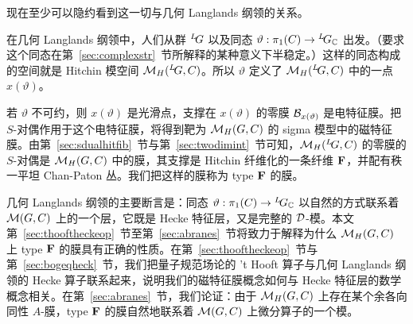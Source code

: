 现在至少可以隐约看到这一切与几何 Langlands 纲领的关系。

在几何 Langlands 纲领中，人们从群 $^L\negthinspace G$ 以及同态 $\vartheta:\pi_1(C)\to{}^L\negthinspace G_{\Bbb{C}}$ 出发。（要求这个同态在第~\ref{sec:complexstr}~节所解释的某种意义下半稳定。）这样的同态构成的空间就是 Hitchin 模空间 $\MH(^L\negthinspace G,C)$。所以 $\vartheta$ 定义了 $\MH(^L\negthinspace G,C)$ 中的一点 $x(\vartheta)$。

若 $\vartheta$ 不可约，则 $x(\vartheta)$ 是光滑点，支撑在 $x(\vartheta)$ 的零膜 ${\cal B}_{x(\vartheta)}$ 是电特征膜。把 $S$-对偶作用于这个电特征膜，将得到靶为 $\MH(G,C)$ 的 sigma 模型中的磁特征膜。由第~\ref{sec:sdualhitfib}~节与第~\ref{sec:twodimint}~节可知，$\MH(^L\negthinspace G,C)$ 的零膜的 $S$-对偶是 $\MH(G,C)$ 中的膜，其支撑是 Hitchin 纤维化的一条纤维 ${\CMF}$，并配有秩一平坦 Chan-Paton 丛。我们把这样的膜称为 type ${\CMF}$ 的膜。

几何 Langlands 纲领的主要断言是：同态 $\vartheta:\pi_1(C)\to {}^L\negthinspace G_{\Bbb{C}}$ 以自然的方式联系着 $\M(G,C)$ 上的一个层，它既是 Hecke 特征层，又是完整的 ${\cal D}$-模。本文第~\ref{sec:thooftheckeop}~节至第~\ref{sec:abranes}~节将致力于解释为什么 $\MH(G,C)$ 上 type ${\CMF}$ 的膜具有正确的性质。在第~\ref{sec:thooftheckeop}~节与第~\ref{sec:bogeqheck}~节，我们把量子规范场论的 't Hooft 算子与几何 Langlands 纲领的 Hecke 算子联系起来，说明我们的磁特征膜概念如何与 Hecke 特征层的数学概念相关。在第~\ref{sec:abranes}~节，我们论证：由于 $\MH(G,C)$ 上存在某个余各向同性 $A$-膜，type ${\CMF}$ 的膜自然地联系着 $\M(G,C)$ 上微分算子的一个模。
